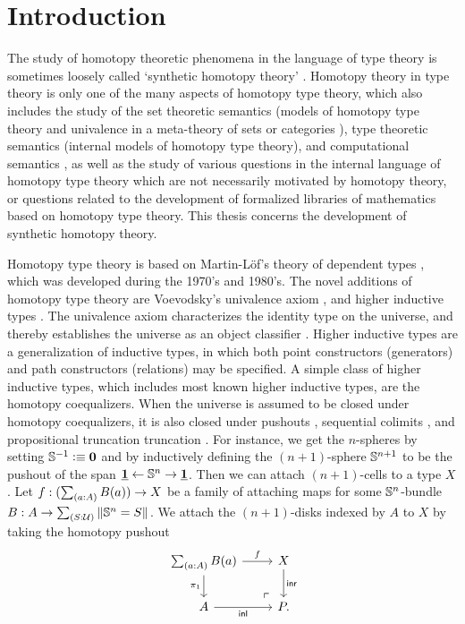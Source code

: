 \chapter{Introduction}
The study of homotopy theoretic phenomena in the language of type theory \cite{hottbook} is 
sometimes loosely called `synthetic homotopy theory' \cite{Brunerie16}. 
Homotopy theory in type theory \cite{Awodey12} is only one of the
many aspects of homotopy type theory, which also includes the study of the
set theoretic semantics (models of homotopy type theory and univalence in a
meta-theory of sets or categories \cite{Awodey14,AwodeyWarren,BezemCoquandHuber,KapulkinLeFanuLumsdaine,Shulman15,Voevodsky15}), type theoretic semantics (internal models of homotopy type
theory), and computational semantics \cite{AngiuliHarperWilson}, as well as the study of various questions
in the internal language of homotopy type theory which are not necessarily 
motivated by homotopy theory, or questions related to the development of
formalized libraries of mathematics based on homotopy type theory.
This thesis concerns the development of synthetic homotopy theory.

Homotopy type theory is based on Martin-L\"of's theory of dependent types \cite{MartinLof84}, which
was developed during the 1970's and 1980's.
The novel additions of homotopy type theory are Voevodsky's univalence axiom \cite{Voevodsky06,Voevodsky10},
and higher inductive types \cite{Lumsdaine11Blog,Shulman11Blog,hottbook}. The univalence axiom characterizes the identity
type on the universe, and thereby establishes the universe as an object classifier \cite{RijkeSpitters}.
Higher inductive types are a generalization of inductive types, in which both
point constructors (generators) and path constructors (relations) may be specified.
A simple class of higher inductive types, which includes most known higher inductive
types, are the homotopy coequalizers. When the universe is assumed to be closed
under homotopy coequalizers, it is also closed under pushouts \cite{hottbook}, 
sequential colimits \cite{hottbook}, and propositional truncation truncation \cite{VanDoorn15}.
For instance, we get the $n$-spheres \cite{Lumsdaine12Blog} by setting $\mathbb{S}^{-1}\vcentcolon\equiv\mathbf{0}$ and
by inductively defining the $(n+1)$-sphere $\mathbb{S}^{n+1}$ to be the pushout
of the span $\underline{\mathbf{1}} \leftarrow\mathbb{S}^{n}\rightarrow\underline{\mathbf{1}}$. 
Then we can attach $(n+1)$-cells to a type $X$.
Let $f:(\sm{a:A}B(a))\to X$ be a family of attaching maps
for some $\mathbb{S}^{n}$-bundle $B:A\to\sm{S:\UU}\brck{\sphere{n}=S}$. We
attach the $(n+1)$-disks indexed by $A$ to $X$ by taking the homotopy pushout
\begin{equation*}
\begin{tikzcd}
\sm{a:A}B(a) \arrow[r,"f"] \arrow[d,swap,"\pi_1"]  & X \arrow[d,"\inr"] \\
A \arrow[r,swap,"\inl"] & P. \arrow[ul,phantom,very near start,"\ulcorner"]
\end{tikzcd}
\end{equation*}


